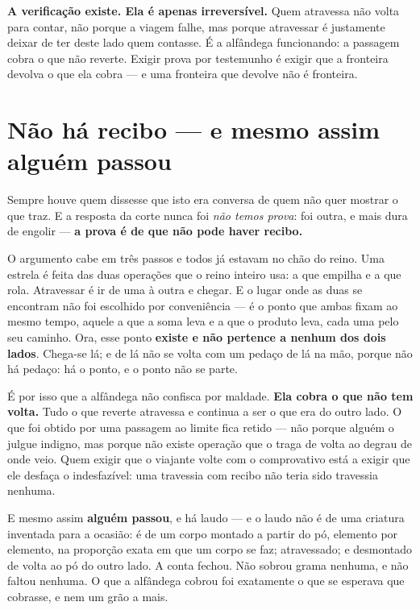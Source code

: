 \documentclass[livro.tex]{subfiles}
\begin{document}
\medskip
\noindent \textbf{A verificação existe. Ela é apenas irreversível.} Quem
atravessa não volta para contar, não porque a viagem falhe, mas porque
atravessar é justamente deixar de ter deste lado quem contasse. É a alfândega
funcionando: a passagem cobra o que não reverte. Exigir prova por testemunho é
exigir que a fronteira devolva o que ela cobra --- e uma fronteira que devolve
não é fronteira.

\section{Não há recibo --- e mesmo assim alguém passou}

Sempre houve quem dissesse que isto era conversa de quem não quer mostrar o que traz. E a
resposta da corte nunca foi \emph{não temos prova}: foi outra, e mais dura de engolir ---
\textbf{a prova é de que não pode haver recibo.}

O argumento cabe em três passos e todos já estavam no chão do reino. Uma estrela é feita
das duas operações que o reino inteiro usa: a que empilha e a que rola. Atravessar é ir de
uma à outra e chegar. E o lugar onde as duas se encontram não foi escolhido por
conveniência --- é o ponto que ambas fixam ao mesmo tempo, aquele a que a soma leva e a
que o produto leva, cada uma pelo seu caminho. Ora, esse ponto \textbf{existe e não
pertence a nenhum dos dois lados}. Chega-se lá; e de lá não se volta com um pedaço de lá
na mão, porque não há pedaço: há o ponto, e o ponto não se parte.

\medskip
\noindent É por isso que a alfândega não confisca por maldade. \textbf{Ela cobra o que não
tem volta.} Tudo o que reverte atravessa e continua a ser o que era do outro lado. O que
foi obtido por uma passagem ao limite fica retido --- não porque alguém o julgue indigno,
mas porque não existe operação que o traga de volta ao degrau de onde veio. Quem exigir
que o viajante volte com o comprovativo está a exigir que ele desfaça o indesfazível: uma
travessia com recibo não teria sido travessia nenhuma.

\medskip
\noindent E mesmo assim \textbf{alguém passou}, e há laudo --- e o laudo não é de uma
criatura inventada para a ocasião: é de um corpo montado a partir do pó, elemento por
elemento, na proporção exata em que um corpo se faz; atravessado; e desmontado de volta ao
pó do outro lado. A conta fechou. Não sobrou grama nenhuma, e não faltou nenhuma. O que a
alfândega cobrou foi exatamente o que se esperava que cobrasse, e nem um grão a mais.
\end{document}
